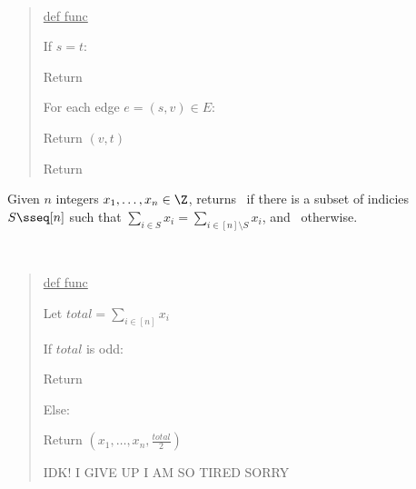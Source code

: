 \documentclass[10pt]{article}
\begin{document}
\begin{solution}\ %
\begin{quote}%
\noindent\ul{def func }%

%

\begin{steps}
  \item If \( s = t \):
    \begin{steps}
    \item Return \boolT~
    \end{steps}
  \end{steps}
  \begin{steps}
  \setcounter{stepsi}{1}
  \item For each edge \( e = (s, v) \in E \):
    \begin{steps}
    \item Return \( (v, t) \)
    \end{steps}
  \item Return \boolF~
\end{steps}

\end{quote}%
\end{solution}%
\pagebreak

Given \( n \) integers \( x_1,\ldots,x_n\in\Z \), returns \boolT~if there is a subset of indicies \( S\sseq [n] \) such that \( \sum_{i\in S}x_i = \sum_{i\in[n]\setminus S} x_i \), and \boolF~otherwise.

\begin{solution}\ %
\begin{quote}%
\noindent\ul{def func }%

%

\begin{steps}
  \item Let \( total = \sum_{i\in [n]} x_i \)
  \item If \( total \) is odd:
    \begin{steps}
    \item Return \boolF
    \end{steps}
  \item Else: 
    \begin{steps}
    \item Return \( (x_1,\ldots,x_n, \frac{total}{2}) \)
    \end{steps}

  \item IDK! I GIVE UP I AM SO TIRED SORRY
\end{steps}

\end{quote}%
\end{solution}%
\end{document}
